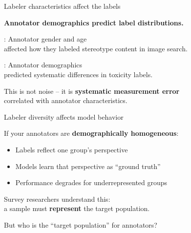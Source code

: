 \documentclass[aspectratio=169,11pt]{beamer}
\begin{document}
\begin{frame}{Labeler characteristics affect the labels}

\textbf{Annotator demographics predict label distributions.}

\vspace{1em}

\citet{otterbacher2018investigating}: Annotator gender and age\\
affected how they labeled stereotype content in image search.

\vspace{1em}

\citet{alkuwatly2020identifying}: Annotator demographics\\
predicted systematic differences in toxicity labels.

\vspace{1em}

This is not noise -- it is \textbf{systematic measurement error}\\
correlated with annotator characteristics.
\end{frame}

\begin{frame}{Labeler diversity affects model behavior}

If your annotators are \textbf{demographically homogeneous}:
\begin{itemize}
  \item Labels reflect one group's perspective
  \item Models learn that perspective as ``ground truth''
  \item Performance degrades for underrepresented groups
\end{itemize}

\vspace{1em}

Survey researchers understand this:\\
a sample must \textbf{represent} the target population.

\vspace{1em}

But who is the ``target population'' for annotators?
\end{frame}
\end{document}
